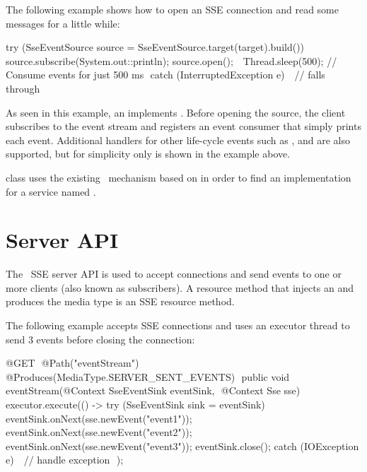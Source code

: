The following example shows how to open an SSE connection and read some messages for a little
while:

\begin{listing}{1}
  try (SseEventSource source = SseEventSource.target(target).build()) {
	source.subscribe(System.out::println);
	source.open();  
	Thread.sleep(500); 		// Consume events for just 500 ms 
  } catch (InterruptedException e) { 
	// falls through 
  }
\end{listing}

As seen in this example, an  implements . Before opening the source, the client subscribes to the event stream and registers an event consumer that simply prints each event. Additional handlers for other life-cycle events such as ,  and  are also supported, but for simplicity only  is shown in the example above.

 class uses the existing \jaxrs\ mechanism based on  in order to find an implementation for a service named . 


\section{Server API}
\label{sse_server_api}

The \jaxrs\ SSE server API is used to accept connections and send events to one or more clients (also known as subscribers). A resource method that injects an  and produces the media type  is an SSE resource method.

The following example accepts SSE connections and uses an executor thread to send 3 events before closing the connection:

\begin{listing}{1}
@GET 
@Path("eventStream") 
@Produces(MediaType.SERVER_SENT_EVENTS) 
public void eventStream(@Context SseEventSink eventSink, 
                        @Context Sse sse) {
  executor.execute(() -> {
    try (SseEventSink sink = eventSink) {  
      eventSink.onNext(sse.newEvent("event1"));
      eventSink.onNext(sse.newEvent("event2"));
      eventSink.onNext(sse.newEvent("event3"));
      eventSink.close();
	} catch (IOException e) { 
	  // handle exception 
	}
  });
}
\end{listing}

